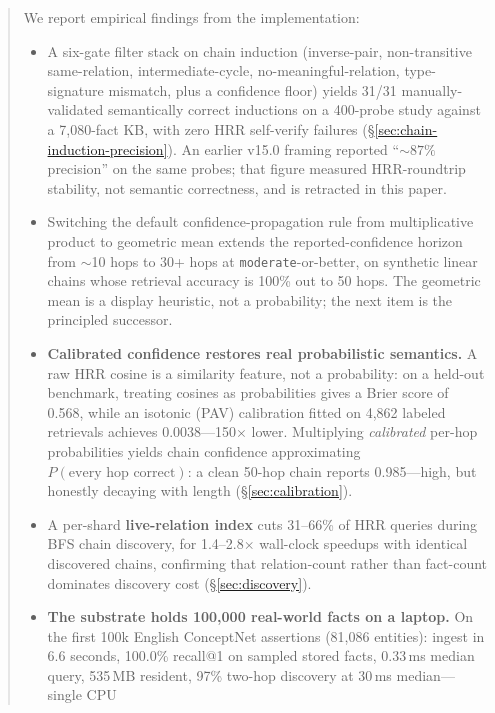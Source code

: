 \documentclass[11pt]{article}
\begin{document}
\begin{abstract}
We report empirical findings from the implementation:
\begin{itemize}[noitemsep, topsep=2pt]
\item A six-gate filter stack on chain induction
      (inverse-pair, non-transitive same-relation, intermediate-cycle,
      no-meaningful-relation, type-signature mismatch, plus a
      confidence floor) yields 31/31 manually-validated semantically
      correct inductions on a 400-probe study against a 7{,}080-fact
      KB, with zero HRR self-verify failures (\S\ref{sec:chain-induction-precision}).
      An earlier v15.0 framing reported ``${\sim}87\%$ precision'' on
      the same probes; that figure measured HRR-roundtrip stability,
      not semantic correctness, and is retracted in this paper.
\item Switching the default confidence-propagation rule from
      multiplicative product to geometric mean extends the
      reported-confidence horizon from $\sim$10 hops to 30+ hops at
      \texttt{moderate}-or-better, on synthetic linear chains whose
      retrieval accuracy is 100\% out to 50 hops. The geometric mean
      is a display heuristic, not a probability; the next item is the
      principled successor.
\item \textbf{Calibrated confidence restores real probabilistic
      semantics.} A raw HRR cosine is a similarity feature, not a
      probability: on a held-out benchmark, treating cosines as
      probabilities gives a Brier score of 0.568, while an isotonic
      (PAV) calibration fitted on 4{,}862 labeled retrievals achieves
      0.0038---150$\times$ lower. Multiplying \emph{calibrated}
      per-hop probabilities yields chain confidence approximating
      $P(\text{every hop correct})$: a clean 50-hop chain reports
      0.985---high, but honestly decaying with length
      (\S\ref{sec:calibration}).
\item A per-shard \textbf{live-relation index} cuts 31--66\% of HRR
      queries during BFS chain discovery, for 1.4--2.8$\times$
      wall-clock speedups with identical discovered chains,
      confirming that relation-count rather than fact-count dominates
      discovery cost (\S\ref{sec:discovery}).
\item \textbf{The substrate holds 100{,}000 real-world facts on a
      laptop.} On the first 100k English ConceptNet assertions
      (81{,}086 entities): ingest in 6.6 seconds, 100.0\% recall@1
      on sampled stored facts, 0.33\,ms median query, 535\,MB
      resident, 97\% two-hop discovery at 30\,ms median---single CPU

\end{itemize}
\end{abstract}
\end{document}
